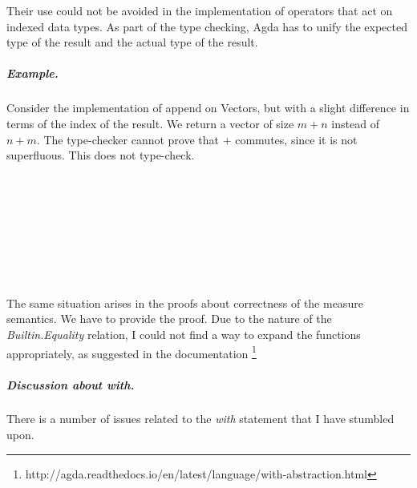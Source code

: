\documentclass[12pt,twoside,notitlepage]{report}
\begin{document}
Their use could not be avoided in the implementation of operators that act on indexed data types. As part of the type checking, Agda has to unify the expected type of the result and the actual type of the result. 

\subparagraph{Example.} Consider the implementation of append on Vectors, but with a slight difference in terms of the index of the result. We return a vector of size $m + n$ instead of $n + m$. The type-checker cannot prove that  $+$ commutes, since it is not superfluous. This does not type-check.

\begin{code}
\\
\> \AgdaSymbol{:}  \AgdaSymbol{\{}  \AgdaSymbol{\}}  \AgdaSymbol{\{} \AgdaSymbol{:}  \AgdaSymbol{\}}\<%
\\
\>[4]\<[6]%
\>[6]   \<%
\\
\>[4]\<[6]%
\>[6]   \<%
\\
\>[4]\<[6]%
\>[6]   \AgdaSymbol{(} \AgdaPrimitive{+} \AgdaSymbol{)}\<%
\\
\> \AgdaInductiveConstructor{[]}  \AgdaSymbol{=} \<%
\\
\> \AgdaSymbol{(}  \AgdaSymbol{)}  \AgdaSymbol{=}     \<%
\\
\end{code}

The same situation arises in the proofs about correctness of the measure semantics. We have to provide the proof. Due to the nature of the \textit{Builtin.Equality} relation, I could not find a way to expand the functions appropriately, as suggested in the documentation \footnote{http://agda.readthedocs.io/en/latest/language/with-abstraction.html}


\subparagraph{Discussion about \textit{with}.}There is a number of issues related to the \textit{with} statement that I have stumbled upon.
\end{document}
